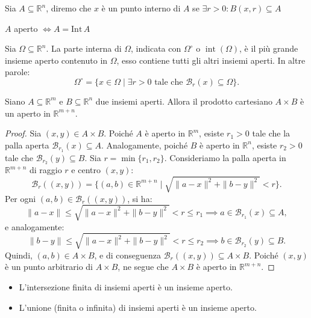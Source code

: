 %
\vspace{0.5cm}
\begin{definition}[\textcolor{blue}{Punti interni}]
	Sia $A \subseteq \mathbb{R}^n$, diremo che $x$ è un punto interno di $A$ se $\exists r > 0: B(x, r) \subseteq A$
\end{definition}
\begin{remark}
	$A$ aperto $\iff A = \text{Int} \, A$
\end{remark}
%
\begin{definition}[\textcolor{blue}{Parte interna}]
	Sia $\Omega \subseteq \mathbb{R}^n$. La parte interna di $\Omega$, indicata con $\Omega^\circ$ o $\operatorname{int}(\Omega)$, è il più grande insieme aperto contenuto in $\Omega$, esso contiene tutti gli altri insiemi aperti. In altre parole:
	\[
	\Omega^\circ = \{ x \in \Omega \mid \exists r > 0 \text{ tale che } \mathcal{B}_r(x) \subseteq \Omega \}.
	\]
\end{definition}
%
%
\vspace{0.5cm}
\begin{prop}
	Siano $A \subseteq \mathbb{R}^m$ e $B \subseteq \mathbb{R}^n$ due insiemi aperti. Allora il prodotto cartesiano $A \times B$ è un aperto in $\mathbb{R}^{m+n}$.
\end{prop}
%
\begin{proof}
	Sia $(x, y) \in A \times B$. Poiché $A$ è aperto in $\mathbb{R}^m$, esiste $r_1 > 0$ tale che la palla aperta $\mathcal{B}_{r_1}(x) \subseteq A$. Analogamente, poiché $B$ è aperto in $\mathbb{R}^n$, esiste $r_2 > 0$ tale che $\mathcal{B}_{r_2}(y) \subseteq B$.
	Sia $r = \min\{r_1, r_2\}$. 
	Consideriamo la palla aperta in $\mathbb{R}^{m+n}$ di raggio $r$ e centro $(x, y)$:
	\[
	\mathcal{B}_r((x, y)) = \{(a, b) \in \mathbb{R}^{m+n} \mid \sqrt{\|a - x\|^2 + \|b - y\|^2} < r\}.
	\]
	Per ogni $(a, b) \in \mathcal{B}_r((x, y))$, si ha:
	\[
	\|a - x\| \leq \sqrt{\|a - x\|^2 + \|b - y\|^2} < r \leq r_1 \implies a \in \mathcal{B}_{r_1}(x) \subseteq A,
	\]
	e analogamente:
	\[
	\|b - y\| \leq \sqrt{\|a - x\|^2 + \|b - y\|^2} < r \leq r_2 \implies b \in \mathcal{B}_{r_2}(y) \subseteq B.
	\]
	Quindi, $(a, b) \in A \times B$, e di conseguenza $\mathcal{B}_r((x, y)) \subseteq A \times B$. Poiché $(x, y)$ è un punto arbitrario di $A \times B$, ne segue che $A \times B$ è aperto in $\mathbb{R}^{m+n}$.
\end{proof}
%
\begin{prop}
	\begin{itemize}
		\item L’intersezione finita di insiemi aperti è un insieme aperto.
		\item L’unione (finita o infinita) di insiemi aperti è un insieme aperto.
	\end{itemize}
\end{prop}
